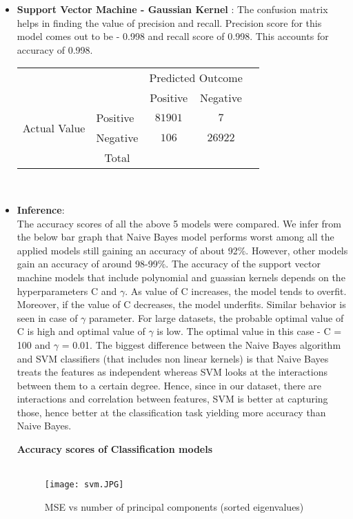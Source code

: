 \documentclass{article}
\begin{document}
\begin{itemize}
\item \textbf{Support Vector Machine - Gaussian Kernel} : The confusion matrix helps in finding the value of precision and recall. Precision score for this model comes out to be - 0.998 and recall score of 0.998. This accounts for accuracy of 0.998. \\
\begin{center}
\begin{tabular}{l|l|c|c|c}
\multicolumn{2}{c}{}&\multicolumn{2}{c}{Predicted Outcome}&\\
\cline{3-4}
\multicolumn{2}{c|}{}&Positive&Negative&\multicolumn{1}{c}{}\\
\cline{2-4}
\multirow{2}{*}{Actual Value}& Positive & $81901$ & $7$\\
\cline{2-4}
& Negative & $106$ & $26922$\\
\cline{2-4}
\multicolumn{1}{c}{} & \multicolumn{1}{c}{Total} & \multicolumn{1}{c}{} & \multicolumn{    1}{c}{} & \multicolumn{1}{c}{}\\
\end{tabular} 
\end{center}\\ 
\newpage
\item \textbf{Inference}: \\
The accuracy scores of all the above 5 models were compared. We infer from the below bar graph that Naive Bayes model performs worst among all the applied models still gaining an accuracy of about 92\%. However, other models gain an accuracy of around 98-99\%. The accuracy of the support vector machine models that include polynomial and guassian kernels depends on the hyperparameters C and $\gamma$. As value of C increases, the model tends to overfit. Moreover, if the value of C decreases, the model underfits. Similar behavior is seen in case of $\gamma$ parameter. For large datasets, the probable optimal value of C is high and optimal value of $\gamma$ is low. The optimal value in this case - C = 100 and $\gamma$ = 0.01. The biggest difference between the Naive Bayes algorithm and SVM classifiers (that includes non linear kernels) is that Naive Bayes treats the features as independent whereas SVM looks at the interactions between them to a certain degree. Hence, since in our dataset, there are interactions and correlation between features, SVM is better at capturing those, hence better at the classification task yielding more accuracy than Naive Bayes.  

 \textbf{ Accuracy scores of Classification models} 
         \\ \\
        \begin{figure}[H]
        \centering
    \texttt{[image: svm.JPG]}
    \caption{ MSE vs number of principal components (sorted eigenvalues) }
    \label{fig:Caption}
    \end{figure}



\end{itemize}
\end{document}
